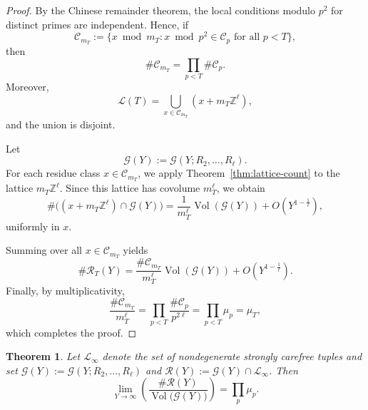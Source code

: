\documentclass{amsart}
\theoremstyle{plain}
\newtheorem{theorem}{Theorem}[section]
\theoremstyle{definition}
\theoremstyle{remark}
\numberwithin{equation}{section}
\begin{document}
\begin{proof}
By the Chinese remainder theorem, the local conditions modulo $p^2$
for distinct primes are independent. Hence, if
\[
\mathcal C_{m_T}
:=
\{x \bmod m_T : x \bmod p^2 \in \mathcal C_p
\text{ for all } p<T\},
\]
then
\[
\#\mathcal C_{m_T}
=
\prod_{p<T} \#\mathcal C_p.
\]
Moreover,
\[
\mathcal L(T)
=
\bigcup_{x\in\mathcal C_{m_T}}
(x+m_T\mathbb Z^\ell),
\]
and the union is disjoint.

Let
\[
\mathcal G(Y)
:=
\mathcal G(Y;R_2,\dots,R_\ell).
\]
For each residue class $x\in\mathcal C_{m_T}$, we apply
Theorem~\ref{thm:lattice-count} to the lattice $m_T\mathbb Z^\ell$.
Since this lattice has covolume $m_T^\ell$, we obtain
\[
\#\bigl((x+m_T\mathbb Z^\ell)\cap\mathcal G(Y)\bigr)
=
\frac{1}{m_T^\ell}
\operatorname{Vol}(\mathcal G(Y))
+
O\!\left(
Y^{1-\frac1\ell}
\right),
\]
uniformly in $x$.

Summing over all $x\in\mathcal C_{m_T}$ yields
\[
\#\mathcal R_T(Y)
=
\frac{\#\mathcal C_{m_T}}{m_T^\ell}
\operatorname{Vol}(\mathcal G(Y))
+
O\!\left(
Y^{1-\frac1\ell}
\right).
\]
Finally, by multiplicativity,
\[
\frac{\#\mathcal C_{m_T}}{m_T^\ell}
=
\prod_{p<T}
\frac{\#\mathcal C_p}{p^{2\ell}}
=
\prod_{p<T}\mu_p
=
\mu_T,
\]
which completes the proof.
\end{proof}

\begin{theorem}\label{thm:infinite-sieve-general}
Let $\mathcal L_\infty$
denote the set of nondegenerate strongly carefree tuples and set $\mathcal G(Y):=\mathcal G(Y; R_2, \dots, R_\ell)$ and $\mathcal{R}(Y):=\mathcal G(Y)\cap\mathcal L_\infty$. Then
\[
\lim_{Y\rightarrow \infty}\left(\frac{\#\mathcal{R}(Y)}{\operatorname{Vol}\!\bigl(\mathcal G(Y)\bigr)}\right)
=\prod_p \mu_p.\]
\end{theorem}
\end{document}
